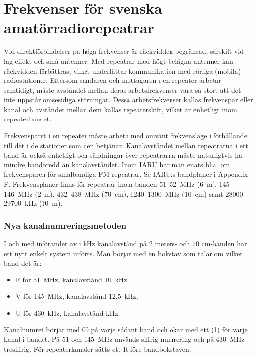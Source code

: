 \chapter{Frekvenser för svenska amatörradiorepeatrar}
Vid direktförbindelser på höga frekvenser är räckvidden begränsad,
särskilt vid låg effekt och små antenner.
Med repeatrar med högt belägna antenner kan räckvidden förbättras,
vilket underlättar kommunikation med rörliga (mobila) radiostationer.
Eftersom sändaren och mottagaren i en repeater arbetar samtidigt, måste
avståndet mellan deras arbetsfrekvenser vara så stort att det inte uppstår
ömsesidiga störningar.
Dessa arbetsfrekvenser kallas frekvenspar eller kanal och avståndet mellan dem
kallas repeaterskift, vilket är enhetligt inom repeaterbandet.

Frekvensparet i en repeater måste arbeta med omvänt frekvensläge i förhållande
till det i de stationer som den betjänar.
Kanalavståndet mellan repeatrarna i ett band är också enhetligt och sändningar
över repeatrarna måste naturligtvis ha mindre bandbredd än kanalavståndet.
Inom IARU har man enats bl.a. om frekvensparen för smalbandiga FM-repeatrar.
Se IARU:s bandplaner i Appendix F.
Frekvensplaner finns för repeatrar inom banden 51--52~MHz (6~m), 145--146~MHz
(2~m), 432--438~MHz (70~cm), 1240--1300~MHz (10~cm) samt 28000--29700~kHz (10~m).

\subsection{Nya kanalnumreringsmetoden}
I och med införandet av i kHz kanalavstånd på 2 meters- och 70 cm-banden har
ett nytt enkelt system införts.
Man börjar med en bokstav som talar om vilket band det är:
\begin{itemize}
  \item F för 51~MHz, kanalavstånd 10~kHz,
  \item V för 145~MHz, kanalavstånd 12,5~kHz, 
  \item U för 430~kHz, kanalavstånd kHz.
\end{itemize}
Kanalnumret börjar med 00 på varje sådant band och ökar med ett (1) för varje
kanal i bandet.
På 51 och 145~MHz används siffrig numrering och på 430~MHz tresiffrig.
För repeaterkanaler sätts ett R före bandbokstaven.

